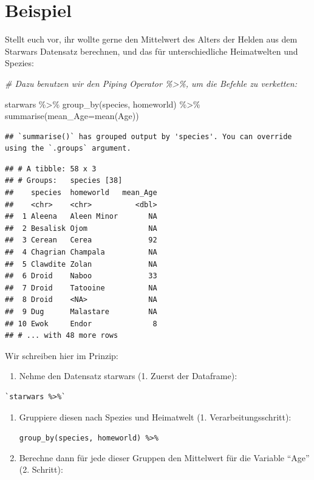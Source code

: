 \documentclass[
]{book}
\newenvironment{Shaded}{\begin{snugshade}}{\end{snugshade}}
\newcommand{\AttributeTok}[1]{\textcolor[rgb]{0.77,0.63,0.00}{#1}}
\newcommand{\CommentTok}[1]{\textcolor[rgb]{0.56,0.35,0.01}{\textit{#1}}}
\newcommand{\FunctionTok}[1]{\textcolor[rgb]{0.00,0.00,0.00}{#1}}
\newcommand{\NormalTok}[1]{#1}
\newcommand{\SpecialCharTok}[1]{\textcolor[rgb]{0.00,0.00,0.00}{#1}}
\providecommand{\tightlist}{%
  \setlength{\itemsep}{0pt}\setlength{\parskip}{0pt}}
\theoremstyle{definition}
\theoremstyle{definition}
\theoremstyle{definition}
\theoremstyle{definition}
\theoremstyle{remark}
\begin{document}
\hypertarget{beispiel}{%
\section{Beispiel}\label{beispiel}}

Stellt euch vor, ihr wollte gerne den Mittelwert des Alters der Helden aus dem Starwars Datensatz berechnen, und das für unterschiedliche Heimatwelten und Spezies:

\begin{Shaded}
\begin{Highlighting}[]
\CommentTok{\# Dazu benutzen wir den Piping Operator \%\textgreater{}\%, um die Befehle zu verketten:}

\NormalTok{starwars }\SpecialCharTok{\%\textgreater{}\%} 
  \FunctionTok{group\_by}\NormalTok{(species, homeworld) }\SpecialCharTok{\%\textgreater{}\%} 
  \FunctionTok{summarise}\NormalTok{(}\AttributeTok{mean\_Age=}\FunctionTok{mean}\NormalTok{(Age))}
\end{Highlighting}
\end{Shaded}

\begin{verbatim}
## `summarise()` has grouped output by 'species'. You can override using the `.groups` argument.
\end{verbatim}

\begin{verbatim}
## # A tibble: 58 x 3
## # Groups:   species [38]
##    species  homeworld   mean_Age
##    <chr>    <chr>          <dbl>
##  1 Aleena   Aleen Minor       NA
##  2 Besalisk Ojom              NA
##  3 Cerean   Cerea             92
##  4 Chagrian Champala          NA
##  5 Clawdite Zolan             NA
##  6 Droid    Naboo             33
##  7 Droid    Tatooine          NA
##  8 Droid    <NA>              NA
##  9 Dug      Malastare         NA
## 10 Ewok     Endor              8
## # ... with 48 more rows
\end{verbatim}

Wir schreiben hier im Prinzip:

\begin{enumerate}
\def\labelenumi{\arabic{enumi}.}
\tightlist
\item
  Nehme den Datensatz starwars (1. Zuerst der Dataframe):
\end{enumerate}

\begin{verbatim}
`starwars %>%`
\end{verbatim}

\begin{enumerate}
\def\labelenumi{\arabic{enumi}.}
\setcounter{enumi}{1}
\item
  Gruppiere diesen nach Spezies und Heimatwelt (1. Verarbeitungsschritt):

  \texttt{\textasciigrave{}group\_by(species,\ homeworld)\ \%\textgreater{}\%\textasciigrave{}}
\item
  Berechne dann für jede dieser Gruppen den Mittelwert für die Variable ``Age'' (2. Schritt):
\end{enumerate}
\end{document}
